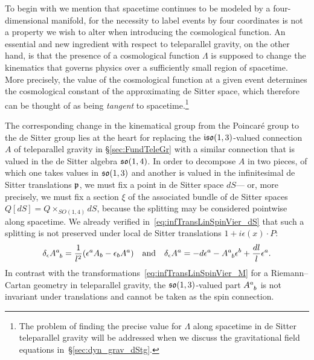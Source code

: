 \documentclass[
final,
11pt,
a4paper,
DIV=11,
headinclude=true,
footinclude=false,
bibliography=totoc,
twoside=true,  %
BCOR=5mm
]{scrbook}
\begin{document}
To begin with we mention that spacetime continues to be modeled 
by a four-dimensional manifold, for the necessity to label events 
by four coordinates is not a property we wish to alter when 
introducing the cosmological function. An essential and new 
ingredient with respect to teleparallel gravity, on the other 
hand, is that the presence of a cosmological function $\Lambda$ 
is supposed to change the kinematics that governs physics over 
a sufficiently small region of spacetime.  More precisely, the 
value of the cosmological function at a given event determines 
the cosmological constant of the approximating de Sitter space, 
which therefore can be thought of as being \emph{tangent} to 
spacetime.\footnote{The problem of finding the precise value for 
  $\Lambda$ along spacetime in de Sitter teleparallel gravity 
  will be addressed when we discuss the gravitational field 
  equations in~\S\ref{sec:dyn_grav_dStg}.}

The corresponding change in the kinematical group from the 
Poincar\'e group to the de Sitter group lies at the heart for 
replacing the $\mathfrak{iso}(1,3)$-valued connection $A$ of 
teleparallel gravity in \S\ref{sec:FundTeleGr} with a similar 
connection that is valued in the de Sitter algebra 
$\mathfrak{so}(1,4)$. In order to decompose $A$ in two pieces, of which 
one takes values in $\mathfrak{so}(1,3)$ and another is valued in the 
infinitesimal de Sitter translations $\mathfrak{p}$, we must fix 
a point in de Sitter space $dS$--- or, more precisely, we must 
fix a section $\xi$ of the associated bundle of de Sitter spaces 
$Q[dS] = Q \times_{SO(1,4)} dS$, because the splitting may be 
considered pointwise along spacetime. We already verified 
in~\eqref{eq:infTransLinSpinVier_dS} that such a splitting is not 
preserved under local de Sitter translations $1 
+ i\epsilon(x)\cdot P$:
\begin{equation*}
  \delta_\epsilon A\ind{^a_b} = \frac{1}{l^2}(\epsilon^a A_b 
  - \epsilon_b A^a)
  \quad\text{and}\quad
  \delta_\epsilon A^a = -d\epsilon^a - A\ind{^a_b}\epsilon^b 
  + \frac{dl}{l}\epsilon^a.
\end{equation*}
In contrast with the 
transformations~\eqref{eq:infTransLinSpinVier_M} for 
a Riemann--Cartan geometry in teleparallel gravity, the 
$\mathfrak{so}(1,3)$-valued part $A\ind{^a_b}$ is not invariant under 
translations and cannot be taken as the spin connection.
\end{document}
